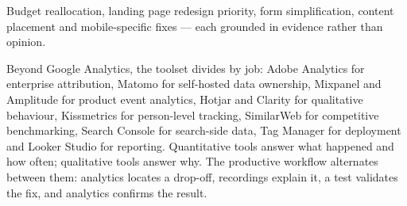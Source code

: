 \documentclass{MMTextbook}
\begin{document}
\begin{exambox}
Budget reallocation, landing page redesign priority, form simplification, content
placement and mobile-specific fixes --- each grounded in evidence rather than
opinion.
\end{exambox}

\begin{summarybox}
Beyond Google Analytics, the toolset divides by job: Adobe Analytics for
enterprise attribution, Matomo for self-hosted data ownership, Mixpanel and
Amplitude for product event analytics, Hotjar and Clarity for qualitative
behaviour, Kissmetrics for person-level tracking, SimilarWeb for competitive
benchmarking, Search Console for search-side data, Tag Manager for deployment and
Looker Studio for reporting. Quantitative tools answer what happened and how
often; qualitative tools answer why. The productive workflow alternates between
them: analytics locates a drop-off, recordings explain it, a test validates the
fix, and analytics confirms the result.
\end{summarybox}




\backmatter
\printindex
\end{document}
